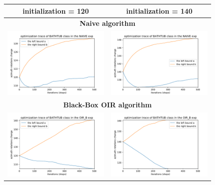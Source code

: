\begin{figure}[h]
\centering
\tabcolsep=0.03cm
   \begin{tabular}{c|c}  \hline
   \textbf{initialization = 120} & \textbf{initialization = 140} \\  \hline 
   \multicolumn{2}{c}{\textbf{Naive algorithm}} \\   
\includegraphics[width = 9cm]{supimages/converge/run0_1_1_naive.pdf} &
\includegraphics[width = 9cm]{supimages/converge/run1_1_1_naive.pdf} \\   \hline
\multicolumn{2}{c}{\textbf{Black-Box OIR algorithm}} \\  
\includegraphics[width = 9cm]{supimages/converge/run0_1_1_OIR_B.pdf} &
\includegraphics[width = 9cm]{supimages/converge/run1_1_1_OIR_B.pdf} \\   \hline

\end{tabular}
\end{figure}
